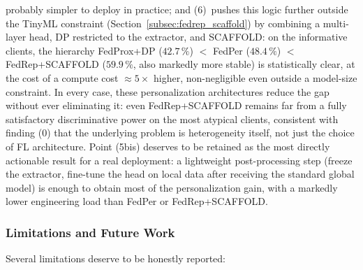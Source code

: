 \documentclass{article}
\begin{document}
probably simpler to deploy in practice; and (6)~pushes this logic further
outside the TinyML constraint (Section~\ref{subsec:fedrep_scaffold}) by
combining a multi-layer head, DP restricted to the extractor, and SCAFFOLD: on
the informative clients, the hierarchy FedProx+DP ($42.7\,\%$) $<$ FedPer
($48.4\,\%$) $<$ FedRep+SCAFFOLD ($59.9\,\%$, also markedly more stable) is
statistically clear, at the cost of a compute cost $\approx 5\times$ higher,
non-negligible even outside a model-size constraint. In every case, these
personalization architectures reduce the gap without ever eliminating it: even
FedRep+SCAFFOLD remains far from a fully satisfactory discriminative power on
the most atypical clients, consistent with finding (0) that the underlying
problem is heterogeneity itself, not just the choice of FL architecture. Point
(5bis) deserves to be retained as the most directly actionable result for a real
deployment: a lightweight post-processing step (freeze the extractor, fine-tune
the head on local data after receiving the standard global model) is enough to
obtain most of the personalization gain, with a markedly lower engineering load
than FedPer or FedRep+SCAFFOLD.

\subsubsection{Limitations and Future Work}
\label{subsec:synthesis_limits}

Several limitations deserve to be honestly reported:
\end{document}
